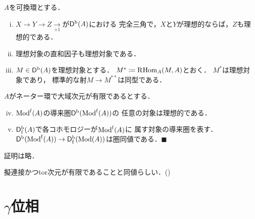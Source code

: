 \begin{PRP}[{\cite[Exercise I.30]{KS90}}]
    \(A\)を可換環とする．
    \begin{enumerate}[(i)]\setlength{\leftskip}{2zw}
        \item \(X\to Y\to Z\underset{+1}{\to}\)が\(\Dompb(A)\)における
        完全三角で，\(X\)と\(Y\)が理想的ならば，\(Z\)も理想的である．
        \item 理想対象の直和因子も理想対象である．
        \item \(M\in\Dompb(A)\)を理想対象とする．
        \(M^\ast\coloneqq \RHom_A(M,A)\)とおく．
        \(M^\ast\)は理想対象であり，
        標準的な射\(M\to M^{\ast\ast}\)は同型である．
    \end{enumerate}

    \(A\)がネーター環で大域次元が有限であるとする．
    \begin{enumerate}[(i)]\setcounter{enumi}{3}\setlength{\leftskip}{2zw}
        \item \(\Modf(A)\)の導来圏\(\Dompb(\Modf(A))\)の
        任意の対象は理想的である．
        \item \(\Dompbf(A)\)で各コホモロジーが\(\Modf(A)\)に
        属す対象の導来圏を表す．
        \(\Dompb(\Modf(A))\to\Dompbf(\Mod(A))\)は圏同値である．\(\blacksquare\)
    \end{enumerate}
\end{PRP}   
証明は略．

擬連接かつtor次元が有限であることと同値らしい．(\cite[lem 15.74.2]{SP})







































\section{\(\gamma\)位相}

